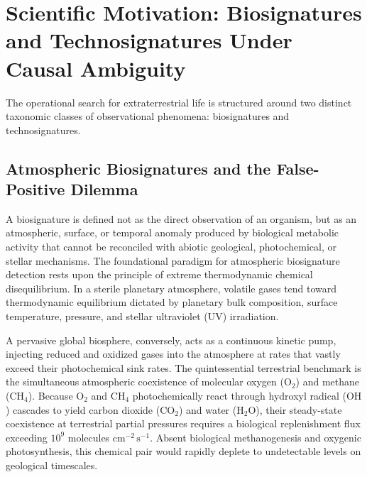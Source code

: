 \section{Scientific Motivation: Biosignatures and Technosignatures Under Causal Ambiguity}\label{sec:biosignatures_technosignatures}

The operational search for extraterrestrial life is structured around two distinct taxonomic classes of observational phenomena: biosignatures and technosignatures. 

\subsection{Atmospheric Biosignatures and the False-Positive Dilemma}
A biosignature is defined not as the direct observation of an organism, but as an atmospheric, surface, or temporal anomaly produced by biological metabolic activity that cannot be reconciled with abiotic geological, photochemical, or stellar mechanisms. The foundational paradigm for atmospheric biosignature detection rests upon the principle of extreme thermodynamic chemical disequilibrium. In a sterile planetary atmosphere, volatile gases tend toward thermodynamic equilibrium dictated by planetary bulk composition, surface temperature, pressure, and stellar ultraviolet (UV) irradiation. 

A pervasive global biosphere, conversely, acts as a continuous kinetic pump, injecting reduced and oxidized gases into the atmosphere at rates that vastly exceed their photochemical sink rates. The quintessential terrestrial benchmark is the simultaneous atmospheric coexistence of molecular oxygen ($\mathrm{O}_2$) and methane ($\mathrm{CH}_4$). Because $\mathrm{O}_2$ and $\mathrm{CH}_4$ photochemically react through hydroxyl radical ($\mathrm{OH}$) cascades to yield carbon dioxide ($\mathrm{CO}_2$) and water ($\mathrm{H}_2\mathrm{O}$), their steady-state coexistence at terrestrial partial pressures requires a biological replenishment flux exceeding $10^9$ molecules $\mathrm{cm}^{-2}\,\mathrm{s}^{-1}$. Absent biological methanogenesis and oxygenic photosynthesis, this chemical pair would rapidly deplete to undetectable levels on geological timescales.

